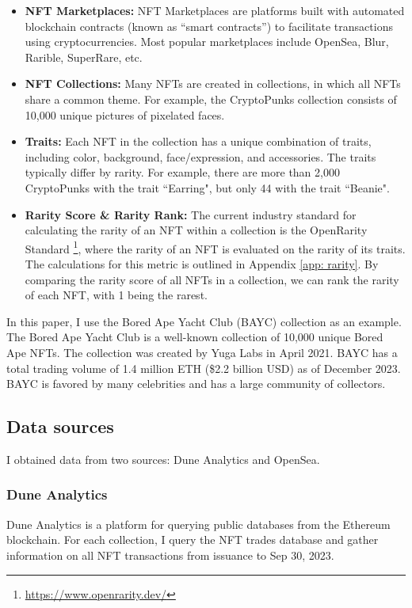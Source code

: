 \documentclass[12pt]{article}
\begin{document}
\begin{itemize}

    \item \textbf{NFT Marketplaces:} NFT Marketplaces are platforms built with automated blockchain contracts (known as ``smart contracts'') to facilitate transactions using cryptocurrencies. Most popular marketplaces include OpenSea, Blur, Rarible, SuperRare, etc. 

    \item \textbf{NFT Collections:} Many NFTs are created in collections, in which all NFTs share a common theme. For example, the CryptoPunks collection consists of 10,000 unique pictures of pixelated faces. 

    \item \textbf{Traits:} Each NFT in the collection has a unique combination of traits, including color, background, face/expression, and accessories. The traits typically differ by rarity. For example, there are more than 2,000 CryptoPunks with the trait ``Earring", but only 44 with the trait ``Beanie".
    
    \item \textbf{Rarity Score \& Rarity Rank: } The current industry standard for calculating the rarity of an NFT within a collection is the OpenRarity Standard \footnote{\url{https://www.openrarity.dev/}}, where the rarity of an NFT is evaluated on the rarity of its traits. The calculations for this metric is outlined in Appendix \ref{app: rarity}. By comparing the rarity score of all NFTs in a collection, we can rank the rarity of each NFT, with 1 being the rarest.
\end{itemize}

In this paper, I use the Bored Ape Yacht Club (BAYC) collection as an example. The Bored Ape Yacht Club is a well-known collection of 10,000 unique Bored Ape NFTs. The collection was created by Yuga Labs in April 2021. BAYC has a total trading volume of 1.4 million ETH (\$2.2 billion USD) as of December 2023. BAYC is favored by many celebrities and has a large community of collectors.

\subsection{Data sources}
I obtained data from two sources: Dune Analytics and OpenSea.

\subsubsection{Dune Analytics}
Dune Analytics is a platform for querying public databases from the Ethereum blockchain. For each collection, I query the NFT trades database and gather information on all NFT transactions from issuance to Sep 30, 2023.
\end{document}

